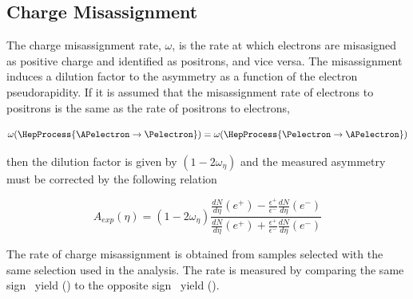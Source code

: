 \subsection{Charge Misassignment}

The charge misassignment rate, $\omega$, is the rate at which electrons are
misasigned as positive charge and identified as positrons, and vice versa. The
misassignment induces a dilution factor to the asymmetry as a function of the
electron pseudorapidity. If it is assumed that the misassignment rate of
electrons to positrons is the same as the rate of positrons to electrons, \ie 

\begin{equation}
  \omega( \HepProcess{\APelectron \to \Pelectron} ) =
  \omega( \HepProcess{\Pelectron \to \APelectron} )
\end{equation}

then the dilution factor is given by $(1-2\omega_\eta)$ and the measured
asymmetry must be corrected by the following relation

\begin{equation}
  A_{exp}(\eta) = (1-2\omega_\eta)
                \frac{
                    \frac{dN}{d\eta}(e^+)-
                    \frac{\epsilon^+}{\epsilon^-}\frac{dN}{d\eta}(e^-)
                }
                {
                    \frac{dN}{d\eta}(e^+)+
                    \frac{\epsilon^+}{\epsilon^-}\frac{dN}{d\eta}(e^-)
                }
\end{equation}

The rate of charge misassignment is obtained from \Zee samples selected with
the same selection used in the analysis. The rate is measured by comparing the
same sign \PZ\ yield (\HepProcess{\PZ\to\Pepm\Pepm}) to the opposite sign \PZ\
yield (\HepProcess{\PZ\to\Pepm\Pemp}).





